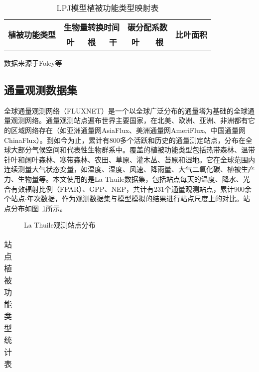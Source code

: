 \begin{table}[!htbp]
    \centering
    \caption{LPJ模型植被功能类型映射表}
    \label{tab:LPJ-PFT-map}
    \begin{threeparttable}
        \begin{tabular}{lcccccc}
            \toprule[1.5pt] 
            \multirow{2}{*}{\textbf{植被功能类型}} & \multicolumn{3}{c}{\textbf{生物量转换时间}} & \multicolumn{2}{c}{\textbf{碳分配系数}} & \multirow{2}{*}{\textbf{比叶面积}} \\ 
            \cmidrule(lr){2-4} \cmidrule(lr){5-6}
            & \textbf{叶} & \textbf{根} & \textbf{干} & \textbf{叶} & \textbf{根} &  \\ 
            \midrule[1.5pt]
            \bottomrule[1.5pt]
        \end{tabular}
        \begin{tablenotes}
            \footnotesize
            \item[]数据来源于Foley等~\cite{foley1996integrated}
        \end{tablenotes}
    \end{threeparttable}
\end{table}

\subsection{通量观测数据集}
全球通量观测网络（FLUXNET）是一个以全球广泛分布的通量塔为基础的全球通量观测网络。通量观测站点遍布世界主要国家，在北美、欧洲、亚洲、非洲都有它的区域网络存在（如亚洲通量网AsiaFlux、美洲通量网AmeriFlux、中国通量网ChinaFlux）。到如今为止，累计有800多个活跃和历史的通量测定站点，分布在全球大部分气候空间和代表性生物群系中。覆盖的植被功能类型包括热带森林、温带针叶和阔叶森林、寒带森林、农田、草原、灌木丛、苔原和湿地。它在全球范围内连续测量大气状态变量，如温度、湿度、风速、降雨量、大气二氧化碳、植被生产力、生物量等。本文使用的是La Thuile数据集，包括站点每天的温度、降水、光合有效辐射比例（FPAR）、GPP、NEP，共计有231个通量观测站点，累计900余个站点$\cdot$年次数据，作为观测数据集与模型模拟的结果进行站点尺度上的对比。站点分布如图~\ref{fig:Thuile-site-POI}所示。

\begin{figure}[!htbp]
    \centering
    \caption{La Thuile观测站点分布}
    \label{fig:Thuile-site-POI}
\end{figure}

\begin{table}[!htbp]
    \centering
    \caption{站点植被功能类型统计表}
    \label{tab:site-PFT-stat}
    \begin{threeparttable}
        \begin{tabular}{c}
            \toprule[1.5pt] 
            \midrule[1.5pt]
            \bottomrule[1.5pt]
        \end{tabular}
    \end{threeparttable}
\end{table}

